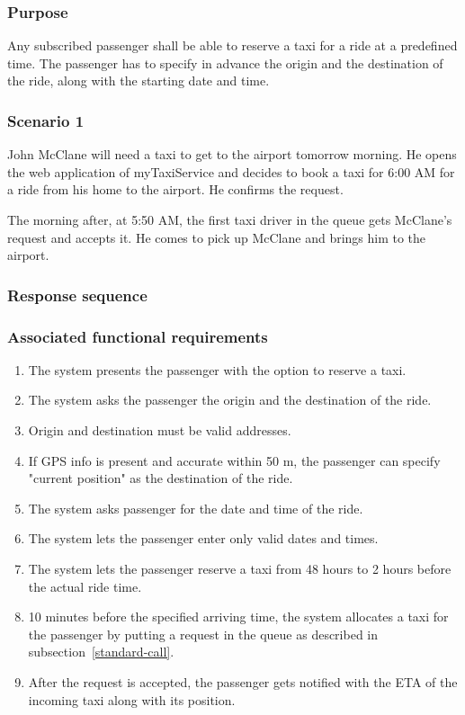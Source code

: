 \subsubsection{Purpose}

Any subscribed passenger shall be able to reserve a taxi for a ride at a predefined time. The passenger has to specify in advance the origin and the destination of the ride, along with the starting date and time.

\subsubsection{Scenario 1}
John McClane will need a taxi to get to the airport tomorrow morning. He opens the web application of myTaxiService and decides to book a taxi for 6:00 AM for a ride from his home to the airport. He confirms the request.

The morning after, at 5:50 AM, the first taxi driver in the queue gets McClane's request and accepts it. He comes to pick up McClane and brings him to the airport.

\subsubsection{Response sequence}

\subsubsection{Associated functional requirements}
\begin{enumerate}
\item The system presents the passenger with the option to reserve a taxi.
\item The system asks the passenger the origin and the destination of the ride.
\item Origin and destination must be valid addresses.
\item If GPS info is present and accurate within 50 m, the passenger can specify "current position" as the destination of the ride.
\item The system asks passenger for the date and time of the ride.
\item The system lets the passenger enter only valid dates and times.
\item The system lets the passenger reserve a taxi from 48 hours to 2 hours before the actual ride time.
\item 10 minutes before the specified arriving time, the system allocates a taxi for the passenger by putting a request in the queue as described in subsection~\ref{standard-call}.
\item After the request is accepted, the passenger gets notified with the ETA of the incoming taxi along with its position.
\end{enumerate}